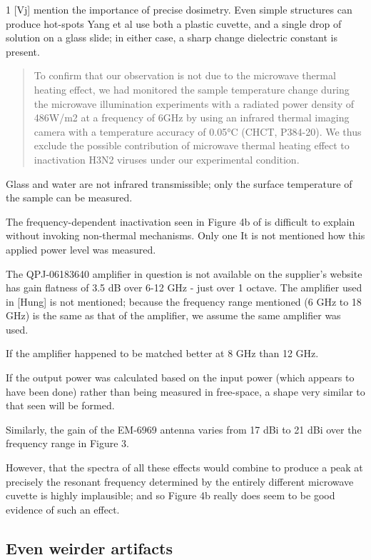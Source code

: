 \documentclass[paper.tex]{subfiles}
\begin{document}
\begin{multicols}{1}
[Vj] mention the importance of precise dosimetry. Even simple structures can produce hot-spots 
Yang et al use both a plastic cuvette, and a single drop of solution on a glass slide; in either case, a sharp change dielectric constant is present.

\begin{quote}
	To confirm that our observation is not due to the microwave thermal heating effect, we had monitored the sample temperature change during the microwave illumination experiments with a radiated power density of 486W/m2 at a frequency of 6GHz by using an infrared thermal imaging camera with a temperature accuracy of 0.05°C (CHCT, P384-20).  We thus exclude the possible contribution of microwave thermal heating effect to inactivation H3N2 viruses under our experimental condition.
\end{quote}

Glass and water are not infrared transmissible; only the surface temperature of the sample can be measured. 

The frequency-dependent inactivation seen in Figure 4b of \cite{Efficient2015} is difficult to explain without invoking non-thermal mechanisms. Only one  It is not mentioned how this applied power level was measured. 

The QPJ-06183640 amplifier in question is not available on the supplier's website \cite{Microwaved} has gain flatness of 3.5 dB over 6-12 GHz - just over 1 octave. The amplifier used in [Hung] is not mentioned; because the frequency range mentioned (6 GHz to 18 GHz) is the same as that of the amplifier, we assume the same amplifier was used. 

If the amplifier happened to be matched better at 8 GHz than 12 GHz.

If the output power was calculated based on the input power (which appears to have been done) rather than being measured in free-space, a shape very similar to that seen will be formed.

Similarly, the gain of the EM-6969 antenna\cite{EM6969} varies from 17 dBi to 21 dBi over the frequency range in Figure 3.

However, that the spectra of all these effects would combine to produce a peak at precisely the resonant frequency determined by the entirely different microwave cuvette is highly implausible; and so Figure 4b really does seem to be good evidence of such an effect.


\subsection{Even weirder artifacts}


\end{multicols}
\end{document}
